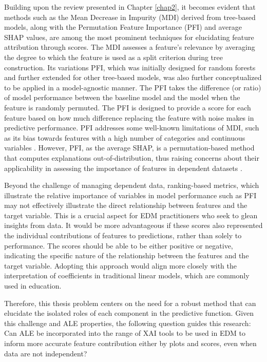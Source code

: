 Building upon the review presented in Chapter \ref{chap2}, it becomes evident that methods such as the Mean Decrease in Impurity (MDI) derived from tree-based models, along with the Permutation Feature Importance (PFI) and average SHAP values, are among the most prominent techniques for elucidating feature attribution through scores. The MDI assesses a feature's relevance by averaging the degree to which the feature is used as a split criterion during tree construction. Its variations PFI,  which was initially designed for random forests and further extended for other tree-based models, was also further conceptualized to be applied in a model-agnostic manner. The PFI takes the difference (or ratio) of model performance between the baseline model and the model when the feature is randomly permuted. The PFI is designed to provide a score for each feature based on how much diﬀerence replacing the feature with noise makes in predictive performance. PFI addresses some well-known limitations of MDI, such as its bias towards features with a high number of categories and continuous variables \cite{Li2019AForests}. However, PFI, as the average SHAP, is a permutation-based method that computes explanations out-of-distribution, thus raising concerns about their applicability in assessing the importance of features in dependent datasets \cite{Strobl2008ConditionalForests, Rudin2019StopInstead, Nembrini2019BiasRecommendations, Nicodemus2011LetterMeasures}. 

Beyond the challenge of managing dependent data, ranking-based metrics, which illustrate the relative importance of variables in model performance such as PFI may not effectively illustrate the direct relationship between features and the target variable. This is a crucial aspect for EDM practitioners who seek to glean insights from data. It would be more advantageous if these scores also represented the individual contributions of features to predictions, rather than solely to performance. The scores should be able to be either positive or negative, indicating the specific nature of the relationship between the features and the target variable. Adopting this approach would align more closely with the interpretation of coefficients in traditional linear models, which are commonly used in education.

Therefore, this thesis problem centers on the need for a robust method that can elucidate the isolated roles of each component in the predictive function. Given this challenge and ALE properties, the following question guides this research: Can ALE be incorporated into the range of XAI tools to be used in EDM to inform more accurate feature contribution either by plots and scores, even when data are not independent? 






